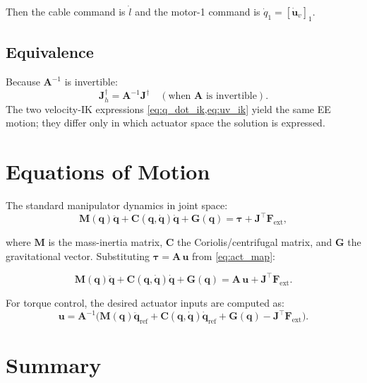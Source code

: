 \documentclass[12pt, a4paper]{article}
\theoremstyle{definition}
\newcommand{\bq}{\bm{q}}
\newcommand{\bu}{\bm{u}}
\newcommand{\btau}{\bm{\tau}}
\newcommand{\bF}{\bm{F}}
\newcommand{\bJ}{\bm{J}}
\newcommand{\bA}{\bm{A}}
\newcommand{\bM}{\bm{M}}
\newcommand{\bC}{\bm{C}}
\newcommand{\bG}{\bm{G}}
\begin{document}
Then the cable command is $\dot{l}$ and the motor-1 command is $\dot{q}_1 =
[\dot{\bu}_v]_1$.

\subsection{Equivalence}

Because $\bA^{-1}$ is invertible:
\begin{equation}
  \bJ_h^\dag = \bA^{-1} \bJ^\dag \quad (\text{when }\bA \text{ is invertible}).
\end{equation}
The two velocity-IK expressions \cref{eq:q_dot_ik,eq:uv_ik} yield the same EE
motion; they differ only in which actuator space the solution is expressed.

\section{Equations of Motion}
\label{sec:eom}

The standard manipulator dynamics in joint space:
\begin{equation}
  \label{eq:eom}
  \bM(\bq)\ddot{\bq} + \bC(\bq, \dot{\bq})\dot{\bq} + \bG(\bq)
  = \btau + \bJ^\top \bF_{\text{ext}},
\end{equation}

where $\bM$ is the mass-inertia matrix, $\bC$ the Coriolis/centrifugal matrix, and
$\bG$ the gravitational vector.  Substituting $\btau = \bA\,\bu$ from
\cref{eq:act_map}:

\begin{equation}
  \boxed{
  \bM(\bq)\ddot{\bq} + \bC(\bq, \dot{\bq})\dot{\bq} + \bG(\bq)
  = \bA\,\bu + \bJ^\top \bF_{\text{ext}} .
  }
\end{equation}

For torque control, the desired actuator inputs are computed as:
\begin{equation}
  \bu = \bA^{-1}
        \bigl(\bM(\bq)\ddot{\bq}_{\text{ref}}
              + \bC(\bq,\dot{\bq})\dot{\bq}_{\text{ref}}
              + \bG(\bq)
              - \bJ^\top \bF_{\text{ext}}\bigr).
\end{equation}

\section{Summary}
\label{sec:summary}
\end{document}
